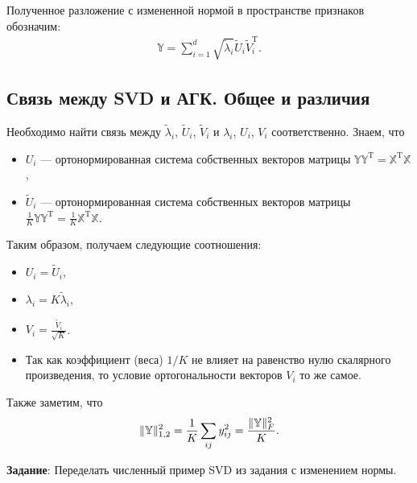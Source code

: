 \documentclass[specialist, 12pt,
subf, %
href, colorlinks=true,
substylefile = spbu.rtx,
]{disser}
\begin{document}
Полученное разложение с измененной нормой в пространстве признаков обозначим:
\begin{gather*}
\mathbb{Y} = \sum\limits_{i = 1}^d \sqrt{\widetilde{\lambda}_i} \widetilde{U}_i \widetilde{V}_i^{\mathrm{T}}.
\end{gather*}

\subsection{Связь между SVD и АГК. Общее и различия}
Необходимо найти связь между $\widetilde{\lambda}_i$, $\widetilde{U}_i$, $\widetilde{V}_i$ и $\lambda_i$, $U_i$, $V_i$ соответственно.%
Знаем, что
\begin{itemize}
\item $U_i$ --- ортонормированная система собственных векторов матрицы $\mathbb{Y}\mathbb{Y}^{\mathrm{T}} = \mathbb{X}^{\mathrm{T}} \mathbb{X}$,
\item $\widetilde{U}_i$  --- ортонормированная система собственных векторов матрицы $\frac{1}{K}\mathbb{Y}\mathbb{Y}^{\mathrm{T}} = \frac{1}{K}\mathbb{X}^{\mathrm{T}} \mathbb{X}$.
\end{itemize}

Таким образом, получаем следующие соотношения:
\begin{itemize}
	\item $U_i = \widetilde{U}_i$,
	\item $\lambda_i = K\widetilde{\lambda}_i$,
	\item $V_i = \frac{\widetilde{V}_i}{\sqrt{K}}$.
    \item Так как коэффициент (веса) $1/K$ не влияет на равенство нулю скалярного произведения,
    то условие ортогональности векторов $V_i$ то же самое.
    \end{itemize}
Также заметим, что
\begin{gather*}
\Arrowvert\mathbb{Y}\Arrowvert_{1,2}^2 = \frac{1}{K} \sum\limits_{ij}  y_{ij}^2 = \frac{\Arrowvert\mathbb{Y}\Arrowvert_F^2}{K}.
\end{gather*}

\textbf{Задание}: Переделать численный пример SVD из задания с изменением нормы.
\end{document}
